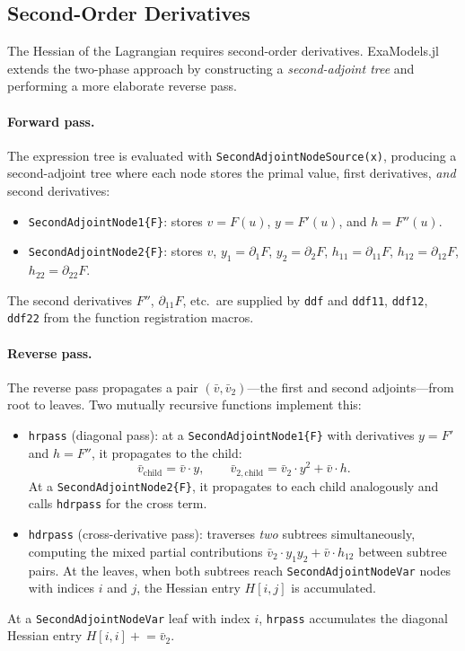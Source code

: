 \documentclass[11pt]{article}
\begin{document}
\subsection{Second-Order Derivatives}
\label{sec:ad:second}

The Hessian of the Lagrangian requires second-order derivatives. ExaModels.jl extends the two-phase approach by constructing a \emph{second-adjoint tree} and performing a more elaborate reverse pass.

\paragraph{Forward pass.}
The expression tree is evaluated with \texttt{SecondAdjointNodeSource(x)}, producing a second-adjoint tree where each node stores the primal value, first derivatives, \emph{and} second derivatives:
\begin{itemize}
  \item \texttt{SecondAdjointNode1\{F\}}: stores $v = F(u)$, $y = F'(u)$, and $h = F''(u)$.
  \item \texttt{SecondAdjointNode2\{F\}}: stores $v$, $y_1 = \partial_1 F$, $y_2 = \partial_2 F$, $h_{11} = \partial_{11} F$, $h_{12} = \partial_{12} F$, $h_{22} = \partial_{22} F$.
\end{itemize}
The second derivatives $F''$, $\partial_{11} F$, etc.\ are supplied by \texttt{ddf} and \texttt{ddf11}, \texttt{ddf12}, \texttt{ddf22} from the function registration macros.

\paragraph{Reverse pass.}
The reverse pass propagates a pair $(\bar{v}, \bar{v}_2)$---the first and second adjoints---from root to leaves. Two mutually recursive functions implement this:
\begin{itemize}
  \item \texttt{hrpass} (diagonal pass): at a \texttt{SecondAdjointNode1\{F\}} with derivatives $y = F'$ and $h = F''$, it propagates to the child:
  \[
    \bar{v}_{\text{child}} = \bar{v} \cdot y, \qquad
    \bar{v}_{2,\text{child}} = \bar{v}_2 \cdot y^2 + \bar{v} \cdot h.
  \]
  At a \texttt{SecondAdjointNode2\{F\}}, it propagates to each child analogously and calls \texttt{hdrpass} for the cross term.
  \item \texttt{hdrpass} (cross-derivative pass): traverses \emph{two} subtrees simultaneously, computing the mixed partial contributions $\bar{v}_2 \cdot y_1 y_2 + \bar{v} \cdot h_{12}$ between subtree pairs. At the leaves, when both subtrees reach \texttt{SecondAdjointNodeVar} nodes with indices $i$ and $j$, the Hessian entry $H[i,j]$ is accumulated.
\end{itemize}
At a \texttt{SecondAdjointNodeVar} leaf with index $i$, \texttt{hrpass} accumulates the diagonal Hessian entry $H[i,i] \mathrel{+}= \bar{v}_2$.
\end{document}
